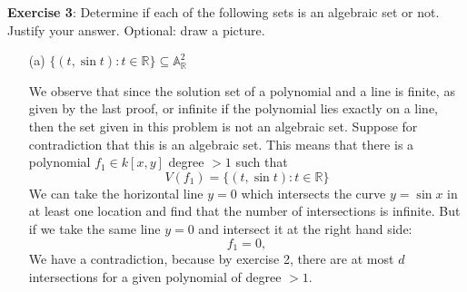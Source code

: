 \documentclass{article}
\begin{document}
\textbf{Exercise 3}: Determine if each of the following sets is an algebraic set or not. Justify your answer. Optional: draw a picture.
    \begin{itemize}
        \item [(a)] $\{(t, \sin{t}): t \in \mathbb{R}\} \subseteq \mathbb{A}_{\mathbb{R}}^{2}$
            \begin{answer}
                We observe that since the solution set of a polynomial and a line is finite, as given by the last proof, or infinite if the polynomial lies exactly on a line, then the set given in this problem is not an algebraic set. Suppose for contradiction that this is an algebraic set. This means that there is a polynomial $f_{1} \in k[x, y]$ degree $> 1$ such that
                    \begin{equation*}
                        V(f_{1}) = \{(t, \sin{t}) : t \in \mathbb{R}\}
                    \end{equation*}
                We can take the horizontal line $y = 0$ which intersects the curve $y = \sin{x}$ in at least one location and find that the number of intersections is infinite. But if we take the same line $y = 0$ and intersect it at the right hand side:
                    \begin{equation*}
                        f_{1} = 0,
                    \end{equation*}
                We have a contradiction, because by exercise 2, there are at most $d$ intersections for a given polynomial of degree $> 1$.
            \end{answer}


\end{itemize}
\end{document}

